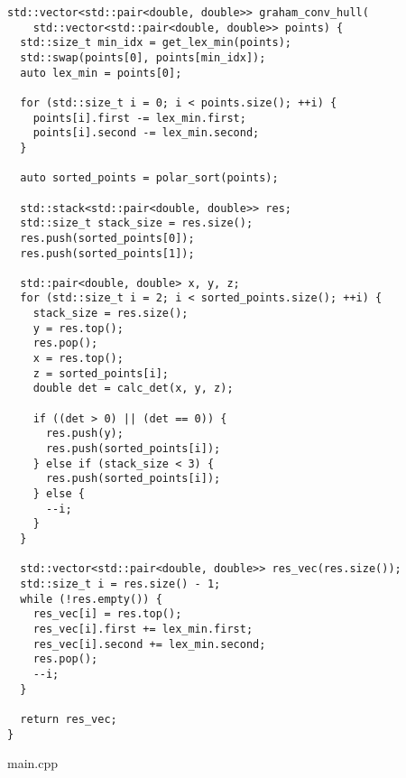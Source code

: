 \documentclass{report}
\begin{document}
\begin{lstlisting}
std::vector<std::pair<double, double>> graham_conv_hull(
    std::vector<std::pair<double, double>> points) {
  std::size_t min_idx = get_lex_min(points);
  std::swap(points[0], points[min_idx]);
  auto lex_min = points[0];

  for (std::size_t i = 0; i < points.size(); ++i) {
    points[i].first -= lex_min.first;
    points[i].second -= lex_min.second;
  }

  auto sorted_points = polar_sort(points);

  std::stack<std::pair<double, double>> res;
  std::size_t stack_size = res.size();
  res.push(sorted_points[0]);
  res.push(sorted_points[1]);

  std::pair<double, double> x, y, z;
  for (std::size_t i = 2; i < sorted_points.size(); ++i) {
    stack_size = res.size();
    y = res.top();
    res.pop();
    x = res.top();
    z = sorted_points[i];
    double det = calc_det(x, y, z);

    if ((det > 0) || (det == 0)) {
      res.push(y);
      res.push(sorted_points[i]);
    } else if (stack_size < 3) {
      res.push(sorted_points[i]);
    } else {
      --i;
    }
  }

  std::vector<std::pair<double, double>> res_vec(res.size());
  std::size_t i = res.size() - 1;
  while (!res.empty()) {
    res_vec[i] = res.top();
    res_vec[i].first += lex_min.first;
    res_vec[i].second += lex_min.second;
    res.pop();
    --i;
  }

  return res_vec;
}

\end{lstlisting}
main.cpp
\end{document}
